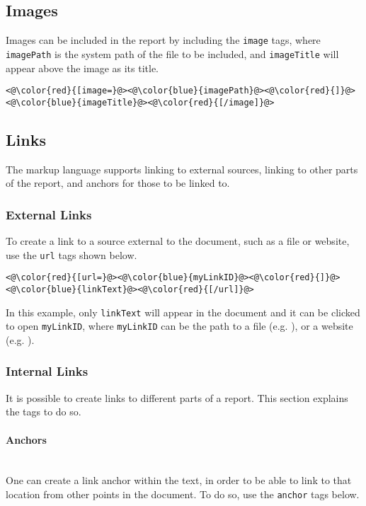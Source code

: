 \documentclass{article}
\begin{document}
\subsection{Images}
Images can be included in the report by including the \verb|image| tags, where \verb|imagePath| is the system path of the file to be included, and \verb|imageTitle| will appear above the image as its title.

\begin{lstlisting}
<@\color{red}{[image=}@><@\color{blue}{imagePath}@><@\color{red}{]}@><@\color{blue}{imageTitle}@><@\color{red}{[/image]}@>
\end{lstlisting}

\subsection{Links}
The markup language supports linking to external sources, linking to other parts of the report, and anchors for those to be linked to. 

\subsubsection{External Links}
To create a link to a source external to the document, such as a file or website, use the \verb|url| tags shown below.

\begin{lstlisting}
<@\color{red}{[url=}@><@\color{blue}{myLinkID}@><@\color{red}{]}@><@\color{blue}{linkText}@><@\color{red}{[/url]}@>
\end{lstlisting}

\noindent In this example, only \verb|linkText| will appear in the document and it can be clicked to open \verb|myLinkID|, where \verb|myLinkID| can be the path to a file (e.g. ), or a website (e.g. ).

\subsubsection{Internal Links}
\label{LBL:internalLinks}
It is possible to create links to different parts of a report. This section explains the tags to do so.


\paragraph{Anchors}~\\
One can create a link anchor within the text, in order to be able to link to that location from other points in the document. To do so, use the \verb|anchor| tags below.
\end{document}
